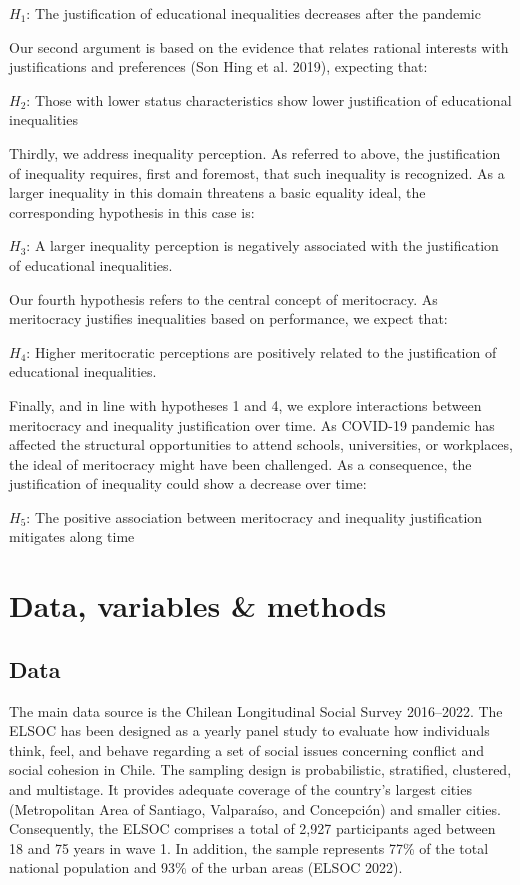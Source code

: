 \documentclass[
]{article}
\begin{document}
\(H_1\): The justification of educational inequalities decreases after
the pandemic

Our second argument is based on the evidence that relates rational
interests with justifications and preferences (Son Hing et al. 2019),
expecting that:

\(H_2\): Those with lower status characteristics show lower
justification of educational inequalities

Thirdly, we address inequality perception. As referred to above, the
justification of inequality requires, first and foremost, that such
inequality is recognized. As a larger inequality in this domain
threatens a basic equality ideal, the corresponding hypothesis in this
case is:

\(H_3\): A larger inequality perception is negatively associated with
the justification of educational inequalities.

Our fourth hypothesis refers to the central concept of meritocracy. As
meritocracy justifies inequalities based on performance, we expect that:

\(H_4\): Higher meritocratic perceptions are positively related to the
justification of educational inequalities.

Finally, and in line with hypotheses 1 and 4, we explore interactions
between meritocracy and inequality justification over time. As COVID-19
pandemic has affected the structural opportunities to attend schools,
universities, or workplaces, the ideal of meritocracy might have been
challenged. As a consequence, the justification of inequality could show
a decrease over time:

\(H_5\): The positive association between meritocracy and inequality
justification mitigates along time

\section{Data, variables \& methods}\label{data-variables-methods}

\subsection{Data}\label{data}

The main data source is the Chilean Longitudinal Social Survey
2016--2022. The ELSOC has been designed as a yearly panel study to
evaluate how individuals think, feel, and behave regarding a set of
social issues concerning conflict and social cohesion in Chile. The
sampling design is probabilistic, stratified, clustered, and multistage.
It provides adequate coverage of the country's largest cities
(Metropolitan Area of Santiago, Valparaíso, and Concepción) and smaller
cities. Consequently, the ELSOC comprises a total of 2,927 participants
aged between 18 and 75 years in wave 1. In addition, the sample
represents 77\% of the total national population and 93\% of the urban
areas (ELSOC 2022).
\end{document}
